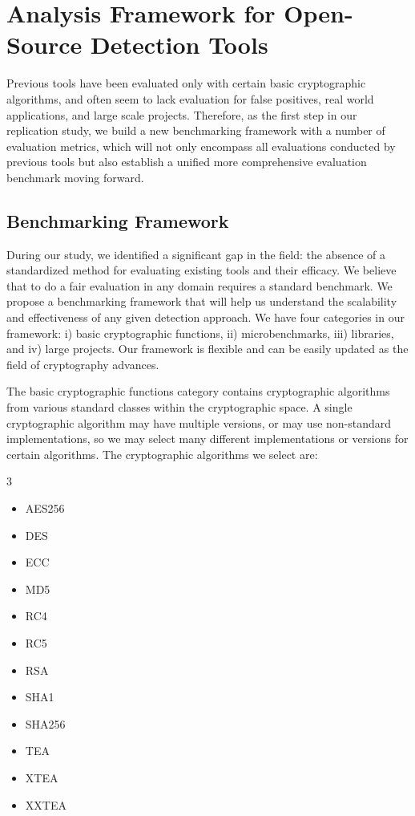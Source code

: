 \section{Analysis Framework for Open-Source Detection Tools}
\label{sec:cryptobinary-framework}

Previous tools have been evaluated only with certain basic cryptographic algorithms, and often seem to lack evaluation for false positives, real world applications, and large scale projects. Therefore, as the first step in our replication study, we build a new benchmarking framework with a number of evaluation metrics, which will not only encompass all evaluations conducted by previous tools but also establish a unified more comprehensive evaluation benchmark moving forward.


\subsection{Benchmarking Framework}
\label{subsec:cryptobinary-framework}
During our study, we identified a significant gap in the field: the absence of a standardized method for evaluating existing tools and their efficacy.
We believe that to do a fair evaluation in any domain requires a standard
benchmark. We propose a benchmarking framework that will help us understand the scalability
and effectiveness of any given detection approach. We have four categories in our framework: i) basic cryptographic functions, ii) microbenchmarks, iii) libraries, and iv) large projects.
Our framework is flexible and can be easily updated as the field of cryptography advances. 

 The basic cryptographic functions category contains cryptographic algorithms from various standard classes within the cryptographic space. A single cryptographic algorithm may have multiple versions, or may use non-standard implementations, so we may select many different implementations or versions for certain algorithms. The cryptographic algorithms we select are:

\vspace*{-10pt}
\begin{multicols}{3}
\begin{itemize}[noitemsep,topsep=0pt]
\item AES256
\item DES
\item ECC
\item MD5
\item RC4 
\item RC5
\item RSA
\item SHA1
\item SHA256
\item TEA
\item XTEA
\item XXTEA
\end{itemize}
\end{multicols}
\vspace*{-10pt}

